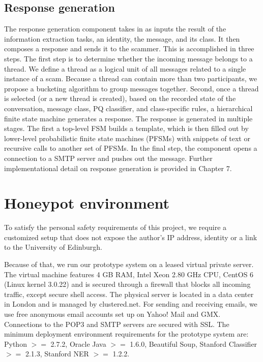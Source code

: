 \subsection*{Response generation}
The response generation component takes in as inputs the result of the information extraction tasks, an identity, the message, and its class. It then composes a response and sends it to the scammer. This is accomplished in three steps. The first step is to determine whether the incoming message belongs to a thread. We define a thread as a logical unit of all messages related to a single instance of a scam. Because a thread can contain more than two participants, we propose a bucketing algorithm to group messages together. Second, once a thread is selected (or a new thread is created), based on the recorded state of the conversation, message class, PQ classifier, and class-specific rules, a hierarchical finite state machine generates a response. The response is generated in multiple stages. The first a top-level FSM builds a template, which is then filled out by lower-level probabilistic finite state machines (PFSMs) with snippets of text or recursive calls to another set of PFSMs. In the final step, the component opens a connection to a SMTP server and pushes out the message. Further implementational detail on response generation is provided in Chapter 7.

\section{Honeypot environment}

To satisfy the personal safety requirements of this project, we require a customized setup that does not expose the author's IP address, identity or a link to the University of Edinburgh.

Because of that, we run our prototype system on a leased virtual private server. The virtual machine features 4 GB RAM, Intel Xeon 2.80 GHz CPU, CentOS 6 (Linux kernel 3.0.22) and is secured through a firewall that blocks all incoming traffic, except secure shell access. The physical server is located in a data center in London and is managed by clustered.net. For sending and receiving emails, we use free anonymous email accounts set up on Yahoo! Mail and GMX. Connections to the POP3 and SMTP servers are secured with SSL. The minimum deployment environment requirements for the prototype system are: Python $>=$ 2.7.2, Oracle Java $>=$ 1.6.0, Beautiful Soup, Stanford Classifier $>=$ 2.1.3, Stanford NER $>=$ 1.2.2. 
